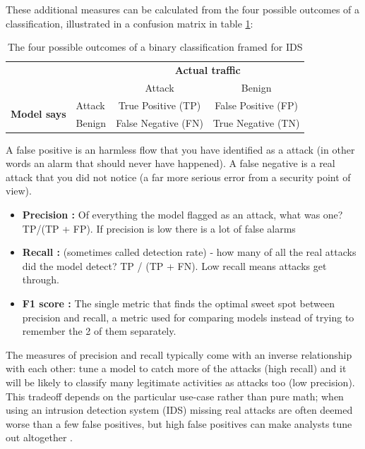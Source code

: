 These additional measures can be calculated from the four possible outcomes of a classification, illustrated in a confusion matrix in table \ref{tab:confusion_matrix}:

\begin{table}[H]
  \centering
  \caption{The four possible outcomes of a binary classification framed for IDS}
  \label{tab:confusion_matrix}
  \renewcommand{\arraystretch}{1.5}
  \begin{tabular}{ll cc}
    \toprule
    & & \multicolumn{2}{c}{\textbf{Actual traffic}} \\
    & & Attack & Benign \\
    \midrule
    \multirow{2}{*}{\textbf{Model says}}
      & Attack  & True Positive (TP) & False Positive (FP) \\
      & Benign  & False Negative (FN) & True Negative (TN) \\
    \bottomrule
  \end{tabular}
\end{table}

A false positive is an harmless flow that you have identified as a attack (in other words an alarm that should never have happened). A false negative is a real attack that you did not notice (a far more serious error from a security point of view).

\begin{itemize}
  \item \textbf{Precision : }  Of everything the model flagged as an attack, what was one? TP/(TP + FP). If precision is low there is a lot of false alarms
  
  \item \textbf{Recall : } (sometimes called detection rate) - how many of all the real
 attacks did the model detect? TP / (TP + FN). Low recall means attacks get through.
 
  \item \textbf{F1 score : } The single metric that finds the optimal sweet spot between precision and recall, a metric used for comparing models instead of trying to remember the 2 of them separately.
\end{itemize}

The measures of precision and recall typically come with an inverse relationship with each other: tune a model to catch more of the attacks (high recall) and it will be likely to classify many legitimate activities as attacks too (low precision). This tradeoff depends on the particular use-case rather than pure math; when using an intrusion detection system (IDS) missing real attacks are often deemed worse than a few false positives, but high false positives can make analysts tune out altogether \cite{umer2022ics}.

